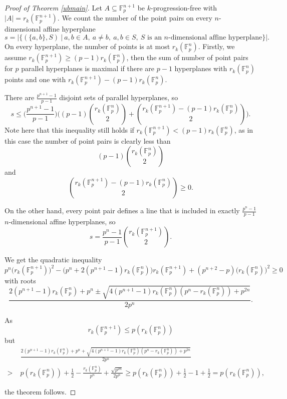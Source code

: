 \documentclass[12pt]{amsart}
\newcommand{\<}{\langle}
\renewcommand{\>}{\rangle}
\numberwithin{equation}{section}
\numberwithin{theorem}{section}
\begin{document}
\begin{proof}[Proof of Theorem \ref{ubmain}]
Let $A\subseteq \mathbb{F}_p^{n+1}$ be $k$-progression-free with $|A|=r_k(\mathbb{F}_p^{n+1})$. We count the number of the point pairs on every $n$-dimensional affine hyperplane $$s = \left| \{ (\{a,b\},S)\ |\ a,b\in A,\ a\ne b,\ a,b\in S,\  \text{$S$ is an $n$-dimensional affine hyperplane}\}\right| .$$ On every hyperplane, the number of points is at most $r_k(\mathbb{F}_p^n)$. Firstly, we assume $r_k(\mathbb{F}_p^{n+1})\geq(p-1)r_k(\mathbb{F}_p^n)$, then the sum of number of point pairs for $p$ parallel hyperplanes is maximal if there are $p-1$ hyperplanes with $r_k(\mathbb{F}_p^n)$ points and one with $r_k(\mathbb{F}_p^{n+1})-(p-1)r_k(\mathbb{F}_p^n)$. 

There are $\frac{p^{n+1}-1}{p-1}$ disjoint sets of parallel hyperplanes, so
\begin{equation*} s\leq\Big(\frac{p^{n+1}-1}{p-1}\Big)\Big((p-1)\binom{r_k(\mathbb{F}_p^n)}{2}+
\binom{r_k(\mathbb{F}_p^{n+1})-(p-1)r_k(\mathbb{F}_p^{n})}{2}\Big).
\end{equation*}
Note here that this inequality still holds if $r_k(\mathbb{F}_p^{n+1})<(p-1)r_k(\mathbb{F}_p^n)$, as in this case the number of point pairs is clearly less than $$(p-1)\binom{r_k(\mathbb{F}_p^n)}{2}$$ and $$\binom{r_k(\mathbb{F}_p^{n+1})-(p-1)r_k(\mathbb{F}_p^{n})}{2}\geq 0.$$


On the other hand, every point pair defines a line that is included in exactly $\frac{p^n-1}{p-1}$ $n$-dimensional affine hyperplanes, so $$s=\frac{p^n-1}{p-1}\binom{r_k(\mathbb{F}_p^{n+1})}{2}.$$


We get the quadratic inequality $$p^n\big(r_k(\mathbb{F}_p^{n+1})\big)^2-\big(p^n+2(p^{n+1}-1)r_k(\mathbb{F}_p^{n})\big)r_k(\mathbb{F}_p^{n+1})+(p^{n+2}-p)\big(r_k(\mathbb{F}_p^{n})\big)^2\geq 0$$ with roots $$\frac{2(p^
{n+1}-1)r_k(\mathbb{F}_p^n)+p^n\pm\sqrt{4(p^
{n+1}-1)r_k(\mathbb{F}_p^n)(p^n-r_k(\mathbb{F}_p^n))+p^{2n}}}{2p^n}.$$ 




As $${r_k(\mathbb{F}_p^{n+1})}\leq p(r_k(\mathbb{F}_p^n))$$ but 
\begin{equation*}
\begin{split}   
 & \frac{2(p^{n+1}-1)r_k(\mathbb{F}_p^n)+p^n+\sqrt{4(p^
{n+1}-1)r_k(\mathbb{F}_p^n)(p^n-r_k(\mathbb{F}_p^n))+p^{2n}}}{2p^n} \\
 > \; &  p (r_k(\mathbb{F}_p^n))+\frac{1}{2}-\frac{r_k(\mathbb{F}_p^n)}{p^n}+\frac{\sqrt{p^{2n}}}{2p^n}\geq p (r_k(\mathbb{F}_p^n))+\frac{1}{2}-1+\frac{1}{2}= p (r_k(\mathbb{F}_p^n)),
\end{split}
\end{equation*}

the theorem follows.
\end{proof}
\end{document}
